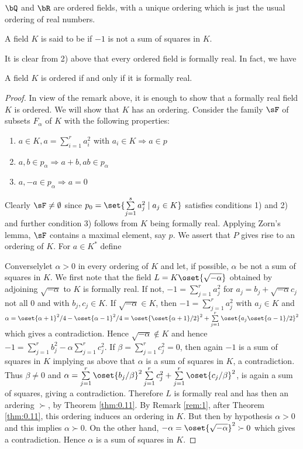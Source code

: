 $\bQ$ and $\bR$ are ordered fields, with a unique ordering which is 
just the usual ordering of real numbers.  

\begin{defi*}
A field $K$ is said to be  if $-1$ is not a sum of 
squares in $K$.
\end{defi*}

It is clear from 2) above that every ordered field is formally real. 
In fact, we have 

\setcounter{theorem}{10}
\begin{theorem}\label{thm:0.11}
A field $K$ is ordered if and only if it is formally real.
\end{theorem}

\begin{proof}
In view of the remark above, it is enough to show that a formally real 
field $K$ is ordered. We will show that $K$ has an ordering. Consider 
the family $\sF$ of subsets $F_\alpha$ of $K$ with the 
following properties:
\begin{enumerate}[1)]
\item $a\in K, a=\sum\limits_{i=1}^{r} a_i^2$ with $a_i\in 
K\Rightarrow a\in p$
\item $a,b\in p_\alpha\Rightarrow a+b, ab\in p_\alpha$
\item $a,-a\in p_\alpha\Rightarrow a=0$
\end{enumerate}
Clearly $\sF\neq\emptyset$ since $p_0=\set{\sum\limits_{j=1}^{s} 
a_j^2\mid a_j\in K}$ satisfies conditions 1) and 2) and further 
condition 3) follows from $K$ being formally real. Applying Zorn's 
lemma, $\sF$ contains a maximal element, say $p$. We assert that $P$ 
gives rise to an ordering of $K$. For $a\in K^*$ define 

Conversely\pageoriginale let $\alpha >0$ in every ordering of $K$ and 
let, if possible, $\alpha$ be not a sum of squares in $K$. We first 
note that the field $L=K\oset{\sqrt{-\alpha}}$ obtained by adjoining 
$\sqrt{-\alpha}$ to $K$ is formally real. If not, 
$-1=\sum\limits_{j=1}^{r}a_j^2$ for $a_j=b_j+\sqrt{-\alpha}c_j$ not 
all $0$ and with $b_j,c_j\in K$. If $\sqrt{-\alpha}\in K$, then 
$-1=\sum\limits_{j=1}^{r}a_j^2$ with $a_j\in K$ and $\alpha 
=\oset{\alpha +1}^2 /4-\oset{\alpha-1}^2 /4=\oset{\oset{\alpha 
+1}/2}^2+\sum\limits_{j=1}^{r}\oset{a_j\oset{\alpha -1}/2}^2$ which 
gives a contradiction. Hence $\sqrt{-\alpha}\notin K$ and hence 
$-1=\sum\limits_{j=1}^{r}b_j^2-\alpha\sum\limits_{j=1}^{r} c_j^2$. If 
$\beta=\sum\limits_{j=1}^{r}c_j^2=0$, then again $-1$ is a sum of 
squares in $K$ implying as above that $\alpha$ is a sum of squares in 
$K$, a contradiction. Thus $\beta\neq 0$ and 
$\alpha=\sum\limits_{j=1}^{r}\oset{b_j/\beta}^2\sum\limits_{j=1}^{r} 
c_j^2+\sum\limits_{j=1}^{r}\oset{c_j/\beta}^2$, is again a sum of 
squares, giving a contradiction. Therefore $L$ is formally real and 
has then an ardering $\succ$, by Theorem \ref{thm:0.11}. By Remark 
\ref{rem:1}, after Theorem \ref{thm:0.11}, this ordering induces an 
ordering in $K$. But then by hypothesis $\alpha >0$ and this implies 
$\alpha\succ 0$. On the other hand, $-\alpha 
=\oset{\sqrt{-\alpha}}^2\succ 0$ which gives a contradiction. Hence 
$\alpha$ is a sum of squares in $K$.
\end{proof}

